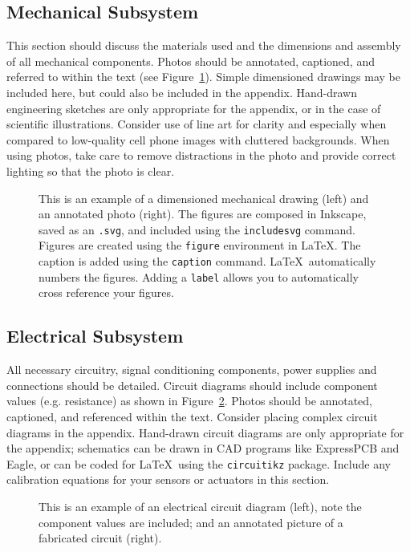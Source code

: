 \documentclass{wrcecapstone}
\begin{document}
\subsection{Mechanical Subsystem}
This section should discuss the materials used and the dimensions and assembly of all mechanical components. Photos should be annotated, captioned, and referred to within the text (see Figure~\ref{f1}). Simple dimensioned drawings may be included here, but could also be included in the appendix. Hand-drawn engineering sketches are only appropriate for the appendix, or in the case of scientific illustrations. Consider use of line art for clarity and especially when compared to low-quality cell phone images with cluttered backgrounds. When using photos, take care to remove distractions in the photo and provide correct lighting so that the photo is clear. 
\begin{figure}
\begin{center}

\end{center}
\caption{This is an example of a dimensioned mechanical drawing (left) and an annotated photo (right).  The figures are composed in Inkscape, saved as an \lstinline{.svg}, and included using the \lstinline{includesvg} command. Figures are created using the \lstinline{figure} environment in \LaTeX. The caption is added using the \lstinline{caption} command. \LaTeX\ automatically numbers the figures. Adding a \lstinline{label} allows you to automatically cross reference your figures.}
\label{f1}
\end{figure}

\subsection{Electrical Subsystem}
All necessary circuitry, signal conditioning components, power supplies and connections should be detailed.  Circuit diagrams should include component values (e.g. resistance) as shown in Figure~\ref{f2}. Photos should be annotated, captioned, and referenced within the text. Consider placing complex circuit diagrams in the appendix. Hand-drawn circuit diagrams are only appropriate for the appendix; schematics can be drawn in CAD programs like ExpressPCB and Eagle, or can be coded for \LaTeX\ using the \lstinline{circuitikz} package.   Include any calibration equations for your sensors or actuators in this section. 
\begin{figure}
\begin{center}

\end{center}
\caption{This is an example of an electrical circuit diagram (left), note the component values are included; and an annotated picture of a fabricated circuit (right).}
\label{f2}
\end{figure}
\end{document}
